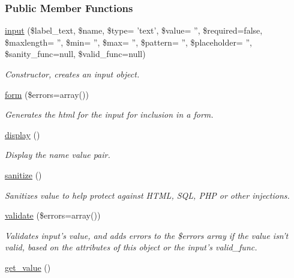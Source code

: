 \subsubsection*{Public Member Functions}
\begin{DoxyCompactItemize}
\item 
\hyperlink{classinput_a13d088ddc4014c18efd350940632ecc0}{input} (\$label\-\_\-text, \$name, \$type= 'text', \$value= '', \$required=false, \$maxlength= '', \$min= '', \$max= '', \$pattern= '', \$placeholder= '', \$sanity\-\_\-func=null, \$valid\-\_\-func=null)
\begin{DoxyCompactList}\small\item\em Constructor, creates an input object. \end{DoxyCompactList}\item 
\hyperlink{classinput_a83b663057f1d0f61768bc12c5a55f25c}{form} (\$errors=array())
\begin{DoxyCompactList}\small\item\em Generates the html for the input for inclusion in a form. \end{DoxyCompactList}\item 
\hyperlink{classinput_a993053ef011cade1db0ceaccb1f4da53}{display} ()
\begin{DoxyCompactList}\small\item\em Display the name value pair. \end{DoxyCompactList}\item 
\hyperlink{classinput_ab8456d2b5a929801af6fe0b36afd458c}{sanitize} ()
\begin{DoxyCompactList}\small\item\em Sanitizes value to help protect against H\-T\-M\-L, S\-Q\-L, P\-H\-P or other injections. \end{DoxyCompactList}\item 
\hyperlink{classinput_aaf4ed91e7abbc20e2396a4b07dbd031a}{validate} (\$errors=array())
\begin{DoxyCompactList}\small\item\em Validates input's value, and adds errors to the \$errors array if the value isn't valid, based on the attributes of this object or the input's valid\-\_\-func. \end{DoxyCompactList}\item 
\hypertarget{classinput_a1b3bcdbb596a1154a944a169ac67f547}{\hyperlink{classinput_a1b3bcdbb596a1154a944a169ac67f547}{get\-\_\-value} ()}\label{classinput_a1b3bcdbb596a1154a944a169ac67f547}


\end{DoxyCompactItemize}

